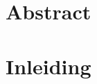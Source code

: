 \section{Abstract}
\textbf{\lipsum[1]}

\section{Inleiding}
\lipsum[2]

\vspace{1em}
\lipsum[3-4]\cite{lorem}